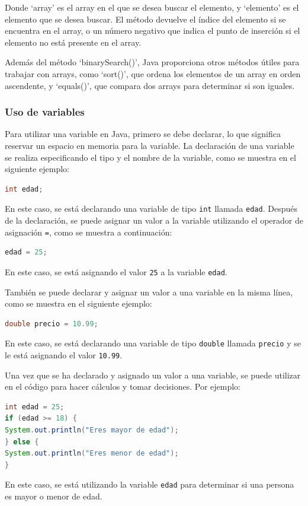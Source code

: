 \documentclass[executivepaper]{article}
\begin{document}
Donde \enquote*{array} es el array en el que se desea buscar el elemento, y \enquote*{elemento} es el elemento que se desea buscar. El método devuelve el índice del elemento si se encuentra en el array, o un número negativo que indica el punto de inserción si el elemento no está presente en el array.

Además del método \enquote*{binarySearch()}, Java proporciona otros métodos útiles para trabajar con arrays, como \enquote*{sort()}, que ordena los elementos de un array en orden ascendente, y \enquote*{equals()}, que compara dos arrays para determinar si son iguales.

\subsubsection{Uso de variables}
Para utilizar una variable en Java, primero se debe declarar, lo que significa reservar un espacio en memoria para la variable. La declaración de una variable se realiza especificando el tipo y el nombre de la variable, como se muestra en el siguiente ejemplo:

\begin{lstlisting}[language=Java]
int edad;
\end{lstlisting}
En este caso, se está declarando una variable de tipo \lstinline{int} llamada \lstinline{edad}. Después de la declaración, se puede asignar un valor a la variable utilizando el operador de asignación \lstinline{=}, como se muestra a continuación:

\begin{lstlisting}[language=Java]
edad = 25;
\end{lstlisting}
En este caso, se está asignando el valor \lstinline{25} a la variable \lstinline{edad}.

También se puede declarar y asignar un valor a una variable en la misma línea, como se muestra en el siguiente ejemplo:

\begin{lstlisting}[language=Java]
double precio = 10.99;
\end{lstlisting}
En este caso, se está declarando una variable de tipo \lstinline{double} llamada \lstinline{precio} y se le está asignando el valor \lstinline{10.99}.

Una vez que se ha declarado y asignado un valor a una variable, se puede utilizar en el código para hacer cálculos y tomar decisiones. Por ejemplo:

\begin{lstlisting}[language=Java]
int edad = 25;
if (edad >= 18) {
System.out.println("Eres mayor de edad");
} else {
System.out.println("Eres menor de edad");
}
\end{lstlisting}
En este caso, se está utilizando la variable \lstinline{edad} para determinar si una persona es mayor o menor de edad.
\end{document}

